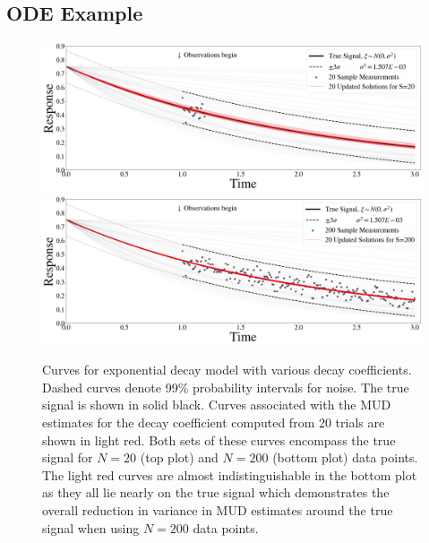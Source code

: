 \subsection{ODE Example}\label{subsec:ode-example}
\begin{figure}[htb]
  \includegraphics[width=\linewidth]{figures/ode/ode_20_reference_solution.png}
  \includegraphics[width=\linewidth]{figures/ode/ode_200_reference_solution.png}
  \caption{Curves for exponential decay model with various decay coefficients. Dashed curves denote 99\% probability intervals for noise. The true signal is shown in solid black.
 Curves associated with the MUD estimates for the decay coefficient computed from 20 trials are shown in light red.
 Both sets of these curves encompass the true signal for $N=20$ (top plot) and $N=200$ (bottom plot) data points.
 The light red curves are almost indistinguishable in the bottom plot as they all lie nearly on the true signal which demonstrates the overall reduction in variance in MUD estimates around the true signal when using $N=200$ data points.
  }
  \label{fig:ode-reference}
\end{figure}

